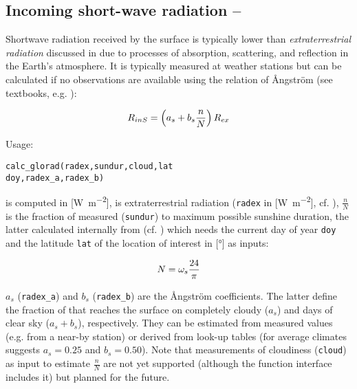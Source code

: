 \subsection{Incoming short-wave radiation -- \radShortwaveIn} \label{sec:meteo:radshort}
Shortwave radiation received by the surface is typically lower than \emph{extraterrestrial radiation} discussed in  due to processes of absorption, scattering, and reflection in the Earth's atmosphere. It is typically measured at weather stations but can be calculated if no observations are available using the relation of {\AA}ngström (see textbooks, e.g. \citet{Maidment1993}):

\begin{equation}\label{eqn:meteo:radshort}
R_{inS}{} = \left( a_s + b_s \frac{n}{N} \right) R_{ex}{}
\end{equation}

\noindent
Usage:
\begin{verbatim}
calc_glorad(radex,sundur,cloud,lat
doy,radex_a,radex_b)
\end{verbatim}

\radShortwaveIn{} is computed in [\si{\watt\per\metre\squared}], \radExtraterr{} is extraterrestrial radiation (\verb!radex! in [\si{\watt\per\metre\squared}], cf. ), $\frac{n}{N}$ is the fraction of measured (\verb!sundur!) to maximum possible sunshine duration, the latter calculated internally from \dayTimeFac{} (cf. ) which needs the current day of year \verb!doy! and the latitude \verb!lat! of the location of interest in [\si{\degree}] as inputs:

\begin{equation}\label{eqn:meteo:radshort:sundur}
N = \omega_{s}{} \frac{24}{\pi}
\end{equation}

$a_s$ (\verb!radex_a!) and $b_s$ (\verb!radex_b!) are the {\AA}ngström coefficients. The latter define the fraction of \radExtraterr{} that reaches the surface on completely cloudy ($a_s$) and days of clear sky ($a_s + b_s$), respectively. They can be estimated from measured values (e.g. from a near-by station) or derived from look-up tables (for average climates \citet{Maidment1993} suggests $a_s = \num{0.25}$ and $b_s = \num{0.50}$). Note that measurements of cloudiness (\verb!cloud!) as input to estimate $\frac{n}{N}$ are not yet supported (although the function interface includes it) but planned for the future.

